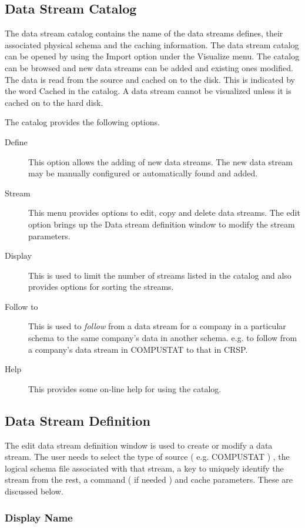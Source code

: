 \subsection{Data Stream Catalog}

The data stream catalog contains the name of the data streams defines, their associated physical schema and the caching information. The data stream catalog can be opened by using the Import option under the Visualize menu. The catalog can be browsed and new data streams can be added and existing ones modified. The data is read from the source and cached on to the disk. This is indicated by the word Cached in the catalog. A data stream cannot be visualized unless it is cached on to the hard disk.

The catalog provides the following options.
\begin{description}
\item[Define]  This option allows the adding of new data streams. The new data stream may be manually configured or automatically found and added.
\item[Stream] This menu provides options to edit, copy and delete data streams. The edit option brings up the Data stream definition window to modify the stream parameters.
\item[Display] This is used to limit the number of streams listed in the catalog and also provides options for sorting the streams.
\item[Follow to] This is used to {\em follow  } from a data stream for a company in a particular schema to the same company's data in another schema. e.g. to follow from a company's data stream in COMPUSTAT to that in CRSP.
\item[Help] This provides some on-line help for using the catalog.
\end{description}

\subsection{Data Stream Definition}

The edit data stream definition window is used to create or modify a data stream. The user needs to select the type of source ( e.g. COMPUSTAT ) , the logical schema file associated with that stream, a key to uniquely identify the stream from the rest, a command ( if needed ) and cache parameters. These are discussed below.


\subsubsection{Display Name}

